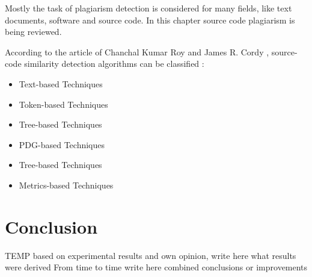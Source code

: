 \documentclass{report}
\begin{document}
Mostly the task of plagiarism detection is considered for many fields, like text documents, software and source code. In this chapter source code plagiarism is being reviewed.

According to the article of Chanchal Kumar Roy and James R. Cordy \cite{software_clone_detection}, source-code similarity detection 
algorithms can be classified :
\begin{itemize}
	\item Text-based Techniques
	\item Token-based Techniques
	\item Tree-based Techniques
	\item PDG-based Techniques
	\item Tree-based Techniques
	\item Metrics-based Techniques
\end{itemize}




\chapter{Conclusion}
\label{cha:Conclusion}

TEMP
based on experimental results and own opinion, write here what results were derived 
From time to time write here combined conclusions or improvements



\end{document}
